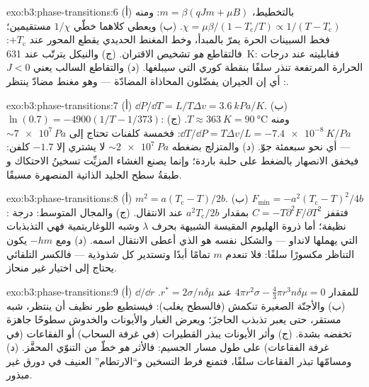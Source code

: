 \begin{solution}{exo:b3:phase-transitions:6}
(أ) بالتخطيط، $m = \beta(qJm + \mu B)$: ومنه $\chi =
\mu\beta/(1 - T_{\text{c}}/T) \propto 1/(T - T_{\text{c}})$. (ب)
ويعطي كلاهما خطّي $1/\chi$ مستقيمين؛ فخط السبينات الحرة يمرّ
بالمبدأ، وخط المغنط الحديدي يقطع المحور عند
$+T_{\text{c}}$: فالتقاطع \emph{هو} تشخيص
الاقتران. (ج) والنيكل يترتّب عند \qty{631}{K}: فقابليته عند درجات الحرارة
المرتفعة تنذر سلفًا بنقطة كوري التي سيبلغها.
(د) والتقاطع السالب يعني $J < 0$: أي إن الجيران يفضّلون
المحاذاة المضادّة --- وهو مغنط مضادّ ينتظر.
\end{solution}

\begin{solution}{exo:b3:phase-transitions:7}
(أ) $\dd P/\dd T = L/T\Delta v = \qty{3.6}{kPa/K}$. (ب)
$\ln(0.7) = -4900(1/T - 1/373)$: ومنه $T \approx \qty{363}{K} =
\qty{90}{\celsius}$. (ج) $\dd T/\dd P = T\Delta v/L =
\qty{-7.4e-8}{K/Pa}$: فخمسة كلفنات تحتاج إلى $\sim\num{7e7}\,\unit{Pa}$
--- أي نحو سبعمئة جوّ. (د) والمتزلج بضغطه
$\sim\qty{2e7}{Pa}$ لا يشتري إلا $-1.7$ كلفن: فيخفق الانصهار بالضغط على
حلبة باردة؛ وإنما يصنع الغشاء المزيِّت تسخينُ الاحتكاك و
طبقةُ سطح الجليد الذاتية المنصهرة مسبقًا.
\end{solution}

\begin{solution}{exo:b3:phase-transitions:8}
(أ) $m^2 = a(T_{\text{c}} - T)/2b$. (ب) $F_{\min} =
-a^2(T_{\text{c}} - T)^2/4b$: فتقفز $C = -T\partial^2F/\partial T^2$
بمقدار $a^2T_{\text{c}}/2b$ عند الانتقال. (ج) والمجال المتوسط:
درجة نظيفة؛ أما ذروة الهليوم المقيسة الشبيهة بحرف $\lambda$ وشبه اللوغاريتمية
فهي التذبذبات التي يهملها لانداو --- والشكل نفسه هو الذي أعطى
الانتقال اسمه. (د) ومع $-hm$ يكون التناظر
مكسورًا سلفًا: فلا تنعدم $m$ تمامًا أبدًا وتستدير كل شذوذية
--- فالكسر التلقائي يحتاج إلى اختيار غير منحاز.
\end{solution}

\begin{solution}{exo:b3:phase-transitions:9}
(أ) $\dd/\dd r$ للمقدار $4\pi r^2\sigma - \tfrac43\pi r^3n\delta\mu = 0$
عند $r^* = 2\sigma/n\delta\mu$. (ب) والأجنّة الصغيرة تنكمش (فالسطح
يغلب): فيستطيع طور نظيف أن ينتظر، شبه مستقر، حتى يعبر تذبذب
الحاجزَ؛ ويعرض الغبار والأيونات والخدوش
سطوحًا جاهزة تخفضه بشدة. (ج) وأثر الأيونات يبذر القطيرات (في غرفة
السحاب) أو الفقاعات (في غرفة الفقاعات) على طول مسار الجسيم:
فالأثر \emph{هو} خطّ من التنوّي المحفَّز. (د) ومسامّها
تبذر الفقاعات سلفًا، فتمنع فرط التسخين و``الارتطام''
العنيف في دورق غير مبذور.
\end{solution}

